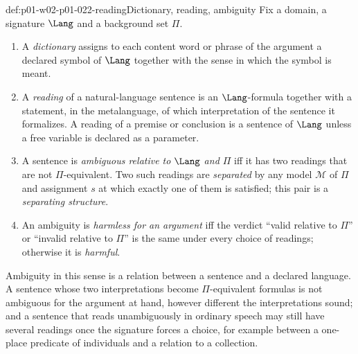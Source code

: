 \begin{hbdefinition}{def:p01-w02-p01-022-reading}{Dictionary, reading, ambiguity}
Fix a domain, a signature \(\Lang\) and a background set \(\Pi\).
\begin{enumerate}
  \item A \emph{dictionary} assigns to each content word or phrase of the
        argument a declared symbol of \(\Lang\) together with the sense in
        which the symbol is meant.
  \item A \emph{reading} of a natural-language sentence is an
        \(\Lang\)-formula together with a statement, in the metalanguage, of
        which interpretation of the sentence it formalizes. A reading of a
        premise or conclusion is a sentence of \(\Lang\) unless a free
        variable is declared as a parameter.
  \item A sentence is \emph{ambiguous relative to \(\Lang\) and \(\Pi\)}
        iff it has two readings that are not \(\Pi\)-equivalent. Two such
        readings are \emph{separated} by any model \(\mathcal M\) of \(\Pi\)
        and assignment \(s\) at which exactly one of them is satisfied; this
        pair is a \emph{separating structure}.
  \item An ambiguity is \emph{harmless for an argument} iff the verdict
        ``valid relative to \(\Pi\)'' or ``invalid relative to \(\Pi\)'' is
        the same under every choice of readings; otherwise it is
        \emph{harmful}.
\end{enumerate}
\end{hbdefinition}

Ambiguity in this sense is a relation between a sentence and a declared
language. A sentence whose two interpretations become \(\Pi\)-equivalent
formulas is not ambiguous for the argument at hand, however different the
interpretations sound; and a sentence that reads unambiguously in ordinary
speech may still have several readings once the signature forces a choice,
for example between a one-place predicate of individuals and a relation to
a collection.

